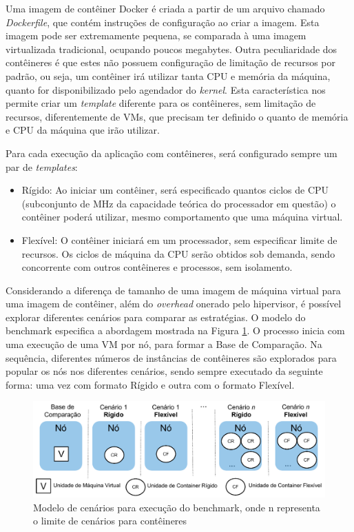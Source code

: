 \documentclass[twoside,english,brazilian]{UNISINOSartigo}
\begin{document}
Uma imagem de contêiner Docker é criada a partir de um arquivo chamado \textit{Dockerfile}, que contém instruções de configuração ao criar a imagem. Esta imagem pode ser extremamente pequena, se comparada à uma imagem virtualizada tradicional, ocupando poucos megabytes. Outra peculiaridade dos contêineres é que estes não possuem configuração de limitação de recursos por padrão, ou seja, um contêiner irá utilizar tanta CPU e memória da máquina, quanto for disponibilizado pelo agendador do \textit{kernel}. Esta característica nos permite criar um \textit{template} diferente para os contêineres, sem limitação de recursos, diferentemente de VMs, que precisam ter definido o quanto de memória e CPU da máquina que irão utilizar. 

Para cada execução da aplicação com contêineres, será configurado sempre um par de \textit{templates}:
\begin{itemize}
	\item Rígido: Ao iniciar um contêiner, será especificado quantos ciclos de CPU (subconjunto de MHz da capacidade teórica do processador em questão) o contêiner poderá utilizar, mesmo comportamento que uma máquina virtual.
	\item Flexível: O contêiner iniciará em um processador, sem especificar limite de recursos. Os ciclos de máquina da CPU serão obtidos sob demanda, sendo concorrente com outros contêineres e processos, sem isolamento. 
\end{itemize} 

Considerando a diferença de tamanho de uma imagem de máquina virtual para uma imagem de contêiner, além do \textit{overhead} onerado pelo hipervisor, é possível explorar diferentes cenários para comparar as estratégias. O modelo do benchmark especifica a abordagem mostrada na Figura \ref{fig:modelo}. O processo inicia com uma execução de uma VM por nó, para formar a Base de Comparação. Na sequência, diferentes números de instâncias de contêineres são explorados para popular os nós nos diferentes cenários, sendo sempre executado da seguinte forma: uma vez com formato Rígido e outra com o formato Flexível.

\begin{figure}[ht!]
	\caption{Modelo de cenários para execução do benchmark, onde n representa o limite de cenários para contêineres}
	\label{fig:modelo}
	\centering%
	\vspace{-0.75\baselineskip}
	\begin{minipage}{0.7\textwidth}
		\includegraphics[width=\textwidth]{images/cropped_cenarios}
	\end{minipage}
\end{figure}
\end{document}
